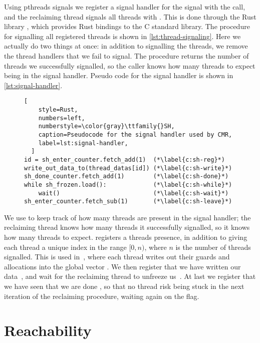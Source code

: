 Using \gls{pthreads} signals we register a signal handler for the  signal with the
 call, and the reclaiming thread signals all threads with .
This is done through the Rust library , which provides Rust bindings to the C standard
library. The procedure for signalling all registered threads is shown in
\cref{lst:thread-signaling}. Here we actually do two things at once: in addition to signalling the
threads, we remove the thread handlers that we fail to signal. The procedure returns the number of
threads we successfully signalled, so the caller knows how many threads to expect being in the
signal handler. Pseudo code for the signal handler is shown in \cref{lst:signal-handler}.

\begin{figure}[ht]
  \begin{lstlisting}[
    style=Rust,
    numbers=left,
    numberstyle=\color{gray}\ttfamily{}SH,
    caption=Pseudocode for the signal handler used by CMR,
    label=lst:signal-handler,
  ]
id = sh_enter_counter.fetch_add(1)  (*\label{c:sh-reg}*)
write_out_data_to(thread_datas[id]) (*\label{c:sh-write}*)
sh_done_counter.fetch_add(1)        (*\label{c:sh-done}*)
while sh_frozen.load():             (*\label{c:sh-while}*)
    wait()                          (*\label{c:sh-wait}*)
sh_enter_counter.fetch_sub(1)       (*\label{c:sh-leave}*)
\end{lstlisting}
\end{figure}


We use  to keep track of how many threads are present in the signal handler;
the reclaiming thread knows how many threads it successfully signalled, so it knows how many threads to
expect.  registers a threads presence, in addition to giving each thread
a unique index in the range $[0, n)$, where $n$ is the number of threads signalled. This is used
in~, where each thread writes out their guards and allocations into
the global vector . We then register that we have written our
data~, and wait for the reclaiming thread to unfreeze
us~. At last we register that we have seen that we are done
, so that no thread risk being stuck in the next iteration of the
reclaiming procedure, waiting again on the  flag.



\section{Reachability\label{sec:impl-reachability}}

